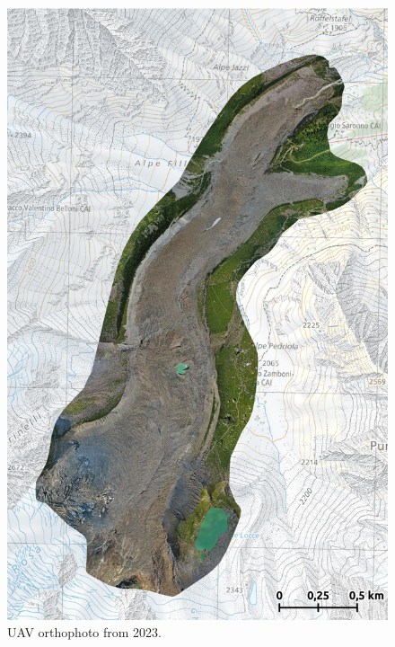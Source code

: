 \begin{figure}[p]
    \centering
    \includegraphics[height=\textheight]{figures/appendix/orto_2023.jpg}
    \caption[]{UAV orthophoto from 2023.}
\end{figure}



